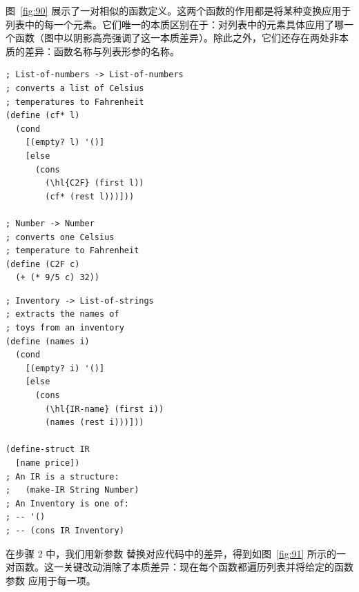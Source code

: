 图~\ref{fig:90} 展示了一对相似的函数定义。这两个函数的作用都是将某种变换应用于列表中的每一个元素。它们唯一的本质区别在于：对列表中的元素具体应用了哪一个函数（图中以阴影高亮强调了这一本质差异）。除此之外，它们还存在两处非本质的差异：函数名称与列表形参的名称。

\begin{center}
  \begin{stepperbox}[unbreakable]
    \noindent\begin{minipage}[t]{0.48\linewidth}\vspace{0pt}
\begin{Verbatim}[commandchars=\\\{\}, fontsize=\fontsize{6.0pt}{7.2pt}\selectfont]
; List-of-numbers -> List-of-numbers
; converts a list of Celsius
; temperatures to Fahrenheit
(define (cf* l)
  (cond
    [(empty? l) '()]
    [else
      (cons
        (\hl{C2F} (first l))
        (cf* (rest l)))]))

; Number -> Number
; converts one Celsius
; temperature to Fahrenheit
(define (C2F c)
  (+ (* 9/5 c) 32))
\end{Verbatim}
    \end{minipage}\hfill
    \begin{minipage}[t]{0.48\linewidth}\vspace{0pt}
\begin{Verbatim}[commandchars=\\\{\}, fontsize=\fontsize{6.0pt}{7.2pt}\selectfont]
; Inventory -> List-of-strings
; extracts the names of
; toys from an inventory
(define (names i)
  (cond
    [(empty? i) '()]
    [else
      (cons
        (\hl{IR-name} (first i))
        (names (rest i)))]))

(define-struct IR
  [name price])
; An IR is a structure:
;   (make-IR String Number)
; An Inventory is one of:
; -- '()
; -- (cons IR Inventory)
\end{Verbatim}
    \end{minipage}
  \end{stepperbox}
  \label{fig:90}
\end{center}

在步骤 2 中，我们用新参数  替换对应代码中的差异，得到如图~\ref{fig:91} 所示的一对函数。这一关键改动消除了本质差异：现在每个函数都遍历列表并将给定的函数参数  应用于每一项。

